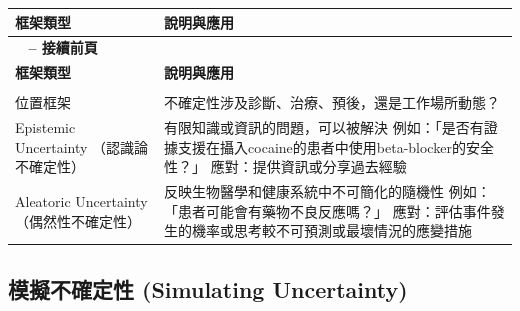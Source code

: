 \documentclass[12pt,a4paper]{article}
\begin{document}
\begin{longtable}{>{\raggedright\arraybackslash}p{4cm} >{\raggedright\arraybackslash}p{11cm}}
\toprule
\textbf{\textcolor{emergency_blue}{框架類型}} & \textbf{\textcolor{emergency_blue}{說明與應用}} \\
\midrule
\endfirsthead

\multicolumn{2}{c}%
{{\bfseries \tablename\ \thetable{} -- 接續前頁}} \\
\toprule
\textbf{\textcolor{emergency_blue}{框架類型}} & \textbf{\textcolor{emergency_blue}{說明與應用}} \\
\midrule
\endhead

\midrule \multicolumn{2}{r}{{接續下頁}} \\ \midrule
\endfoot

\bottomrule
\endlastfoot

\textcolor{emergency_red}{位置框架} & 不確定性涉及診斷、治療、預後，還是工作場所動態？ \\

\textcolor{emergency_red}{Epistemic Uncertainty \newline （認識論不確定性）} & 有限知識或資訊的問題，可以被解決 \newline 例如：「是否有證據支援在攝入cocaine的患者中使用beta-blocker的安全性？」 \newline 應對：提供資訊或分享過去經驗 \\

\textcolor{emergency_red}{Aleatoric Uncertainty \newline （偶然性不確定性）} & 反映生物醫學和健康系統中不可簡化的隨機性 \newline 例如：「患者可能會有藥物不良反應嗎？」 \newline 應對：評估事件發生的機率或思考較不可預測或最壞情況的應變措施 \\
\end{longtable}

\subsection{模擬不確定性 (Simulating Uncertainty)}
\end{document}
